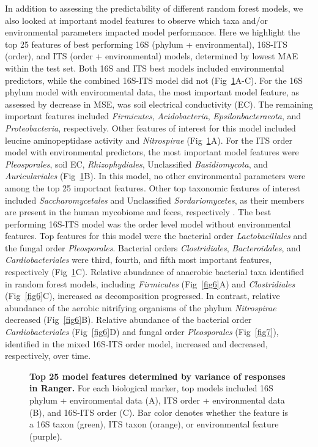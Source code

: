 \documentclass[
  10pt,
  letterpaper,
]{article}
\begin{document}
In addition to assessing the predictability of different random forest
models, we also looked at important model features to observe which taxa
and/or environmental parameters impacted model performance. Here we
highlight the top 25 features of best performing 16S (phylum +
environmental), 16S-ITS (order), and ITS (order + environmental) models,
determined by lowest MAE within the test set. Both 16S and ITS best
models included environmental predictors, while the combined 16S-ITS
model did not (Fig~\ref{fig5}A-C). For the 16S phylum model with
environmental data, the most important model feature, as assessed by
decrease in MSE, was soil electrical conductivity (EC). The remaining
important features included \emph{Firmicutes}, \emph{Acidobacteria},
\emph{Epsilonbacteraeota}, and \emph{Proteobacteria}, respectively.
Other features of interest for this model included leucine
aminopeptidase activity and \emph{Nitrospirae} (Fig~\ref{fig5}A). For
the ITS order model with environmental predictors, the most important
model features were \emph{Pleosporales}, soil EC, \emph{Rhizophydiales},
Unclassified \emph{Basidiomycota}, and \emph{Auriculariales}
(Fig~\ref{fig5}B). In this model, no other environmental parameters were
among the top 25 important features. Other top taxonomic features of
interest included \emph{Saccharomycetales} and Unclassified
\emph{Sordariomycetes}, as their members are present in the human
mycobiome and feces, respectively
\citep{blackwell_fungi_2004, taylor_ascomycota_2015}. The best
performing 16S-ITS model was the order level model without environmental
features. Top features for this model were the bacterial order
\emph{Lactobacillales} and the fungal order \emph{Pleosporales}.
Bacterial orders \emph{Clostridiales}, \emph{Bacteroidales}, and
\emph{Cardiobacteriales} were third, fourth, and fifth most important
features, respectively (Fig~\ref{fig5}C). Relative abundance of
anaerobic bacterial taxa identified in random forest models, including
\emph{Firmicutes} (Fig~\ref{fig6}A) and \emph{Clostridiales}
(Fig~\ref{fig6}C), increased as decomposition progressed. In contrast,
relative abundance of the aerobic nitrifying organisms of the phylum
\emph{Nitrospirae} decreased (Fig~\ref{fig6}B). Relative abundance of
the bacterial order \emph{Cardiobacteriales} (Fig~\ref{fig6}D) and
fungal order \emph{Pleosporales} (Fig~\ref{fig7}), identified in the
mixed 16S-ITS order model, increased and decreased, respectively, over
time.

\begin{figure}[!h]
\caption{{\bf Top 25 model features determined by variance of responses in Ranger.}
For each biological marker, top models included 16S phylum + environmental data (A), ITS order + environmental data (B), and 16S-ITS order (C). Bar color denotes whether the feature is a 16S taxon (green), ITS taxon (orange), or environmental feature (purple).}
\label{fig5}
\end{figure}
\end{document}
